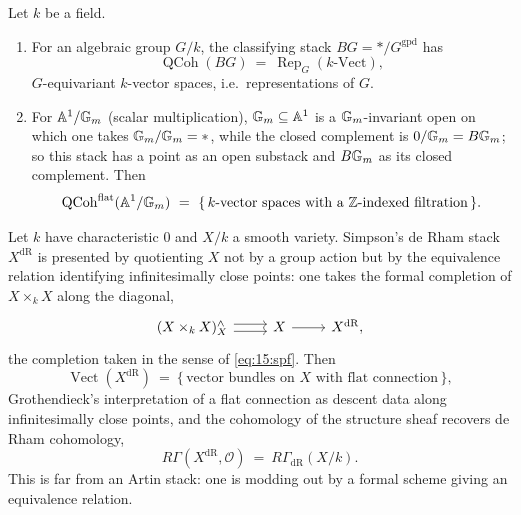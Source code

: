\begin{example}
\label{ex:15:simpson-stacks}
Let $k$ be a field.
\begin{enumerate}
\item For an algebraic group $G/k$, the classifying stack $BG = \ast/G^{\mathrm{gpd}}$
has
\begin{equation*}
\operatorname{QCoh}(BG)\ =\ \operatorname{Rep}_G(k\text{-}\mathrm{Vect}),
\end{equation*}
$G$-equivariant $k$-vector spaces, i.e.\ representations of $G$.
\item For $\mathbb{A}^1/\mathbb{G}_{m}$ (scalar multiplication), $\mathbb{G}_{m}\subseteq\mathbb{A}^1$ is a
$\mathbb{G}_{m}$-invariant open on which one takes $\mathbb{G}_{m}/\mathbb{G}_{m} = \ast$, while the closed complement
is $0/\mathbb{G}_{m} = B\mathbb{G}_{m}$; so this stack has a point as an open substack and $B\mathbb{G}_{m}$ as its
closed complement. Then
\begin{equation*}
\operatorname{QCoh}^{\mathrm{flat}}(\mathbb{A}^1/\Gm)\ =\ \{\,\text{$k$-vector spaces with a $\mathbb{Z}$-indexed filtration}\,\}.
\end{equation*}
\end{enumerate}
\end{example}

\begin{example}
\label{ex:15:de-rham}
Let $k$ have characteristic $0$ and $X/k$ a smooth variety. Simpson's de Rham stack
$X^{\mathrm{dR}}$ is presented by quotienting $X$ not by a group action but by the
equivalence relation identifying infinitesimally close points: one takes the formal
completion of $X\times_k X$ along the diagonal,
\begin{equation}
\label{eq:15:de-rham-presentation}
\begin{tikzcd}
(X\times_k X)^{\wedge}_{X} \arrow[r, shift left=0.6ex] \arrow[r, shift right=0.6ex] & X \arrow[r] & X^{\mathrm{dR}},
\end{tikzcd}
\end{equation}
the completion taken in the sense of \eqref{eq:15:spf}. Then
\begin{equation*}
\operatorname{Vect}(X^{\mathrm{dR}})\ =\ \{\,\text{vector bundles on $X$ with flat connection}\,\},
\end{equation*}
Grothendieck's interpretation of a flat connection as descent data along
infinitesimally close points, and the cohomology of the structure sheaf recovers de
Rham cohomology,
\begin{equation*}
R\Gamma(X^{\mathrm{dR}}, \mathcal{O})\ =\ R\Gamma_{\mathrm{dR}}(X/k).
\end{equation*}
This is far from an Artin stack: one is modding out by a formal scheme giving an
equivalence relation.
\end{example}

